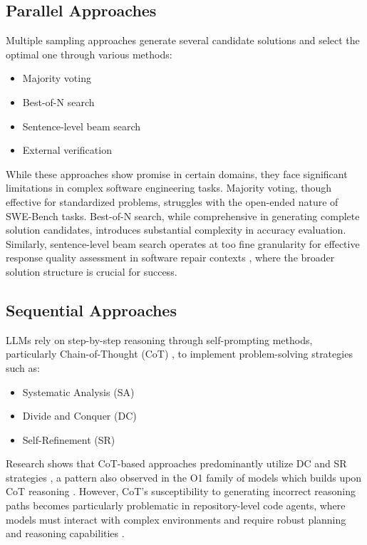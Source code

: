 \subsection{Parallel Approaches}
Multiple sampling approaches generate several candidate solutions and select the optimal one through various methods:
\begin{itemize}
    \item Majority voting \cite{huang2022largelanguagemodelsselfimprove}
    \item Best-of-N search \cite{amini2024variationalbestofnalignment}
    \item Sentence-level beam search \cite{graves2012sequencetransductionrecurrentneural}
    \item External verification \cite{lee2024prometheusvisionvisionlanguagemodeljudge, xiong2024llavacriticlearningevaluatemultimodal, brown2024largelanguagemonkeysscaling}
\end{itemize}

While these approaches show promise in certain domains, they face significant limitations in complex software engineering tasks. Majority voting, though effective for standardized problems, struggles with the open-ended nature of SWE-Bench tasks. Best-of-N search, while comprehensive in generating complete solution candidates, introduces substantial complexity in accuracy evaluation. Similarly, sentence-level beam search operates at too fine granularity for effective response quality assessment in software repair contexts \cite{xu2024llavaO1letvisionlanguage}, where the broader solution structure is crucial for success.

\subsection{Sequential Approaches}
LLMs rely on step-by-step reasoning through self-prompting methods, particularly Chain-of-Thought (CoT) \cite{wei2023chainofthoughtpromptingelicitsreasoning}, to implement problem-solving strategies such as:
\begin{itemize}
    \item Systematic Analysis (SA)
    \item Divide and Conquer (DC)
    \item Self-Refinement (SR)
\end{itemize}

Research shows that CoT-based approaches predominantly utilize DC and SR strategies \cite{xu2024llavaO1letvisionlanguage, chu2024navigateenigmaticlabyrinthsurvey}, a pattern also observed in the O1 family of models which builds upon CoT reasoning \cite{openai_reasoning_docs, wu2024comparativestudyreasoningpatterns}. However, CoT's susceptibility to generating incorrect reasoning paths \cite{wei2023chainofthoughtpromptingelicitsreasoning} becomes particularly problematic in repository-level code agents, where models must interact with complex environments and require robust planning and reasoning capabilities \cite{zheng2024makeslargelanguagemodels}.

